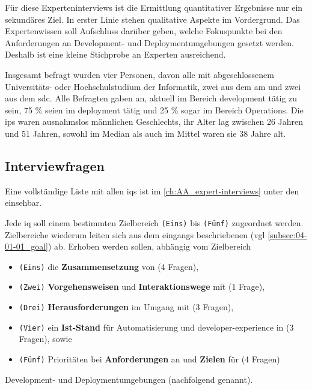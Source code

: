 Für diese Experteninterviews ist die Ermittlung quantitativer Ergebnisse nur ein sekundäres Ziel. In erster Linie stehen qualitative Aspekte im Vordergrund. Das Expertenwissen soll Aufschluss darüber geben, welche Fokuspunkte bei den Anforderungen an Development- und Deploymentumgebungen gesetzt werden. Deshalb ist eine kleine Stichprobe an Experten ausreichend.

Insgesamt befragt wurden vier Personen, davon alle mit abgeschlossenem Universitäts- oder Hochschulstudium der Informatik, zwei aus dem \Gls{am} und zwei aus dem \Gls{sdc}. Alle Befragten gaben an, aktuell im Bereich \Gls{development} tätig zu sein, 75 \% seien im \Gls{deployment} tätig und 25 \% sogar im Bereich Operations. Die \Glspl{ip} waren ausnahmslos männlichen Geschlechts, ihr Alter lag zwischen 26 Jahren und 51 Jahren, sowohl im Median als auch im Mittel waren sie 38 Jahre alt.

\subsection{Interviewfragen}
\label{subsec:04-01-03_interview-questions}

Eine vollständige Liste mit allen \Glspl{iq} ist im \autoref{ch:AA_expert-interviews} unter den  einsehbar.

Jede \acrfull{iq} soll einem bestimmten Zielbereich \texttt{(Eins)} bis \texttt{(Fünf)} zugeordnet werden. Zielbereiche wiederum leiten sich aus dem eingangs beschriebenen  (\acrshort{vgl} \autoref{subsec:04-01-01_goal}) ab. Erhoben werden sollen, abhängig vom Zielbereich

\begin{itemize}
    \item \texttt{(Eins)} die \textbf{Zusammensetzung} von (4 Fragen),
    \item \texttt{(Zwei)} \textbf{Vorgehensweisen} und \textbf{Interaktionswege} mit (1 Frage),
    \item \texttt{(Drei)} \textbf{Herausforderungen} im Umgang mit (3 Fragen),
    \item \texttt{(Vier)} ein \textbf{Ist-Stand} für Automatisierung und \Gls{developer-experience} in (3 Fragen), sowie
    \item \texttt{(Fünf)} Prioritäten bei \textbf{Anforderungen} an und \textbf{Zielen} für (4 Fragen)
\end{itemize}

Development- und Deploymentumgebungen (nachfolgend  genannt).

